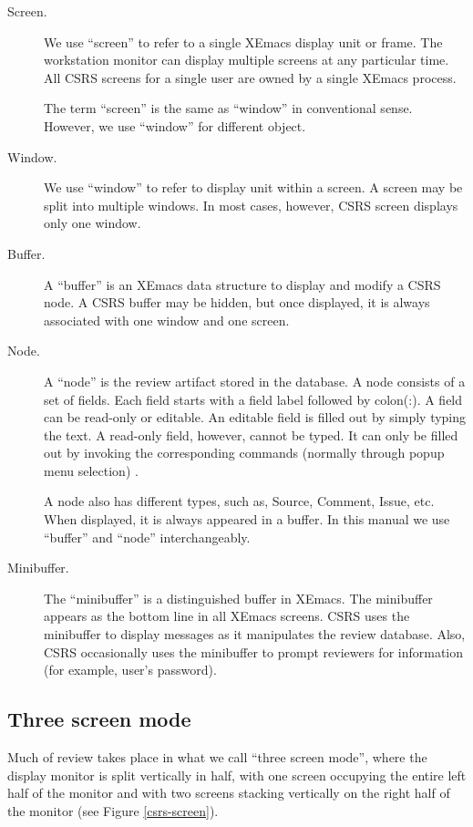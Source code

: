 \begin{description}
\item [Screen.] We use ``screen'' to refer to a single XEmacs display
unit or frame. The workstation monitor can display multiple screens at any
particular time. All CSRS screens for a single user are owned by a
single XEmacs process. 
 
The term ``screen'' is the same as ``window'' in conventional
sense. However, we use ``window'' for different object.

\item [Window.] We use ``window'' to refer to display unit within a
screen. A screen may be split into multiple windows.
In most cases, however, CSRS screen displays only one window.

\item [Buffer.] A ``buffer'' is an XEmacs data structure to display
and modify a CSRS node. A CSRS buffer may be hidden, but once 
displayed, it is always associated with one window and one screen.

\item [Node.] A ``node'' is the review artifact stored in the
database. A node consists of a set of fields. Each field starts with a
field label followed by colon(:). A field can be read-only or editable. 
An editable field is filled out by simply typing the text.
A read-only field, however, cannot be typed. It can only be filled out
by invoking 
the corresponding commands (normally through popup menu selection) .

A node also has different types, such as, Source, Comment, Issue, etc. 
When displayed, it is always appeared in a buffer. 
In this manual we use ``buffer'' and ``node'' interchangeably.

\item [Minibuffer.] The ``minibuffer'' is a distinguished buffer in
XEmacs. The minibuffer appears as the bottom line in all XEmacs
screens. CSRS uses the minibuffer to display messages as it manipulates
the review database. Also, CSRS occasionally uses the minibuffer to
prompt reviewers for information (for example, user's password).

\end{description}

\subsection {Three screen mode}

Much of review takes place in what we call ``three screen mode'',
where the display monitor is split vertically in half, with one screen
occupying the entire left half of the monitor and with two screens
stacking vertically on the right half of the monitor (see Figure
\ref{csrs-screen}). 

